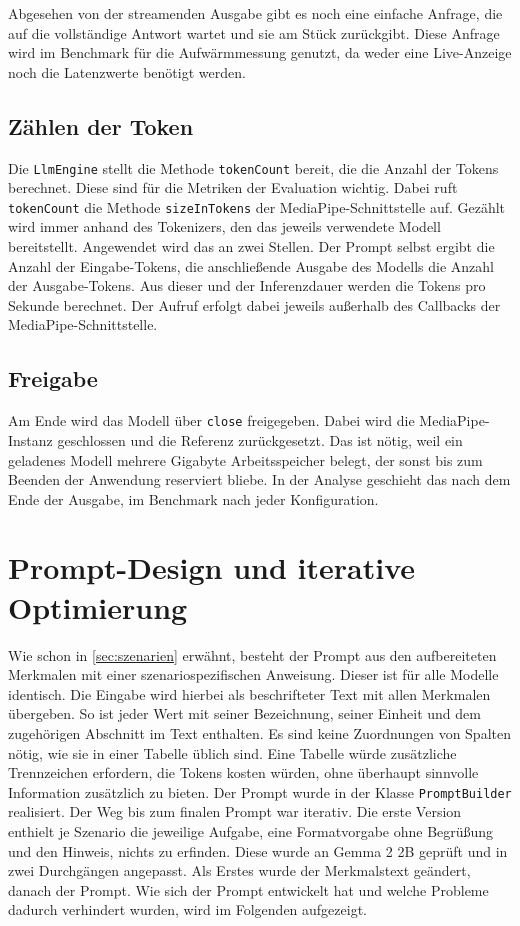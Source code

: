 \noindent Abgesehen von der streamenden Ausgabe gibt es noch eine einfache Anfrage, die auf die vollständige Antwort wartet und sie am Stück zurückgibt. Diese Anfrage wird im Benchmark für die Aufwärmmessung genutzt, da weder eine Live-Anzeige noch die Latenzwerte benötigt werden.

\subsection{Zählen der Token} Die \texttt{LlmEngine} stellt die Methode \texttt{tokenCount} bereit, die die Anzahl der Tokens berechnet. Diese sind für die Metriken der Evaluation wichtig. Dabei ruft \texttt{tokenCount} die Methode \texttt{sizeInTokens} der MediaPipe-Schnittstelle auf. Gezählt wird immer anhand des Tokenizers, den das jeweils verwendete Modell bereitstellt. Angewendet wird das an zwei Stellen. Der Prompt selbst ergibt die Anzahl der Eingabe-Tokens, die anschließende Ausgabe des Modells die Anzahl der Ausgabe-Tokens. Aus dieser und der Inferenzdauer werden die Tokens pro Sekunde berechnet. Der Aufruf erfolgt dabei jeweils außerhalb des Callbacks der MediaPipe-Schnittstelle.

\subsection{Freigabe} Am Ende wird das Modell über \texttt{close} freigegeben. Dabei wird die MediaPipe-Instanz geschlossen und die Referenz zurückgesetzt. Das ist nötig, weil ein geladenes Modell mehrere Gigabyte Arbeitsspeicher belegt, der sonst bis zum Beenden der Anwendung reserviert bliebe. In der Analyse geschieht das nach dem Ende der Ausgabe, im Benchmark nach jeder Konfiguration.

\section{Prompt-Design und iterative Optimierung}
\label{sec:impl-prompt}
Wie schon in \autoref{sec:szenarien} erwähnt, besteht der Prompt aus den aufbereiteten Merkmalen mit einer szenariospezifischen Anweisung. Dieser ist für alle Modelle identisch.
Die Eingabe wird hierbei als beschrifteter Text mit allen Merkmalen übergeben. So ist jeder Wert mit seiner Bezeichnung, seiner Einheit und dem zugehörigen Abschnitt im Text enthalten. Es sind keine Zuordnungen von Spalten nötig, wie sie in einer Tabelle üblich sind. Eine Tabelle würde zusätzliche Trennzeichen erfordern, die Tokens kosten würden, ohne überhaupt sinnvolle Information zusätzlich zu bieten.
Der Prompt wurde in der Klasse \texttt{PromptBuilder} realisiert. Der Weg bis zum finalen Prompt war iterativ. Die erste Version enthielt je Szenario die jeweilige Aufgabe, eine Formatvorgabe ohne Begrüßung und den Hinweis, nichts zu erfinden. Diese wurde an Gemma 2 2B geprüft und in zwei Durchgängen angepasst. Als Erstes wurde der Merkmalstext geändert, danach der Prompt. Wie sich der Prompt entwickelt hat und welche Probleme dadurch verhindert wurden, wird im Folgenden aufgezeigt.
\vspace{\baselineskip}

